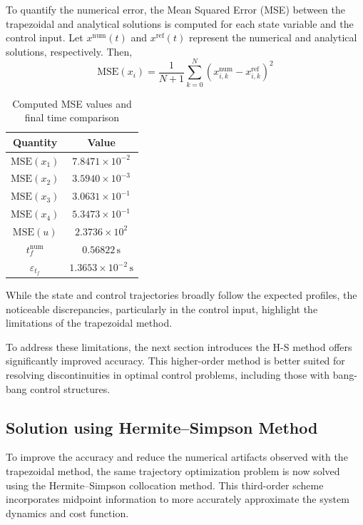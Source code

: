 \vspace{1em}

To quantify the numerical error, the Mean Squared Error (MSE) between the trapezoidal and analytical solutions is computed for each state variable and the control input. Let \( x^{\text{num}}(t) \) and \( x^{\text{ref}}(t) \) represent the numerical and analytical solutions, respectively. Then,
\[
\text{MSE}(x_i) = \frac{1}{N+1} \sum_{k=0}^{N} \left( x_{i,k}^{\text{num}} - x_{i,k}^{\text{ref}} \right)^2
\]



\begin{table}[H]
\centering
\begin{tabular}{|c|c|}
\hline
\textbf{Quantity} & \textbf{Value} \\
\hline
\( \text{MSE}(x_1) \) & \( 7.8471 \times 10^{-2} \) \\
\( \text{MSE}(x_2) \) & \( 3.5940 \times 10^{-3} \) \\
\( \text{MSE}(x_3) \) & \( 3.0631 \times 10^{-1} \) \\
\( \text{MSE}(x_4) \) & \( 5.3473 \times 10^{-1} \) \\
\( \text{MSE}(u) \)   & \( 2.3736 \times 10^{2} \) \\
\hline
\( t_f^{\text{num}} \) & \( 0.56822 \, \text{s} \) \\
\( \varepsilon_{t_f} \) & \( 1.3653 \times 10^{-2} \, \text{s} \) \\
\hline
\end{tabular}
\caption{Computed MSE values and final time comparison}
\end{table}


While the state and control trajectories broadly follow the expected profiles, the noticeable discrepancies, particularly in the control input, highlight the limitations of the trapezoidal method.


To address these limitations, the next section introduces the H-S method offers significantly improved accuracy. This higher-order method is better suited for resolving discontinuities in optimal control problems, including those with bang-bang control structures.



\subsection{Solution using Hermite–Simpson Method}

To improve the accuracy and reduce the numerical artifacts observed with the trapezoidal method, the same trajectory optimization problem is now solved using the Hermite–Simpson collocation method. This third-order scheme incorporates midpoint information to more accurately approximate the system dynamics and cost function.

